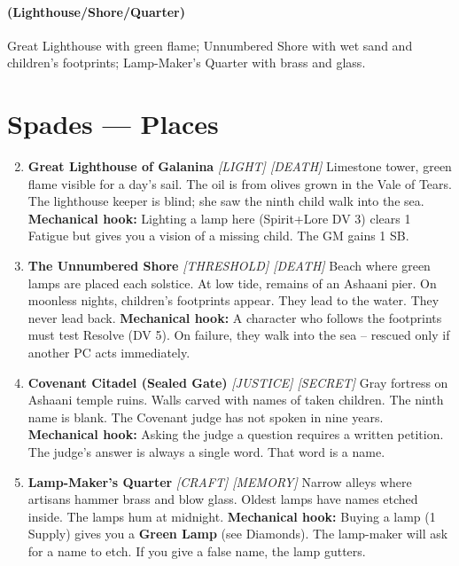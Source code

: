\paragraph*{(Lighthouse/Shore/Quarter)} Great Lighthouse with green flame; Unnumbered Shore with wet sand and children's footprints; Lamp-Maker's Quarter with brass and glass.

\section*{Spades --- Places}
\label{sec:galanina-places}
\begin{enumerate}
\setcounter{enumi}{1}
\item \textbf{Great Lighthouse of Galanina} \hfill \textit{[LIGHT] [DEATH]}  
  Limestone tower, green flame visible for a day's sail. The oil is from olives grown in the Vale of Tears. The lighthouse keeper is blind; she saw the ninth child walk into the sea.  
  \textbf{Mechanical hook:} Lighting a lamp here (Spirit+Lore DV 3) clears 1 Fatigue but gives you a vision of a missing child. The GM gains 1 SB.

\item \textbf{The Unnumbered Shore} \hfill \textit{[THRESHOLD] [DEATH]}  
  Beach where green lamps are placed each solstice. At low tide, remains of an Ashaani pier. On moonless nights, children's footprints appear. They lead to the water. They never lead back.  
  \textbf{Mechanical hook:} A character who follows the footprints must test Resolve (DV 5). On failure, they walk into the sea -- rescued only if another PC acts immediately.

\item \textbf{Covenant Citadel (Sealed Gate)} \hfill \textit{[JUSTICE] [SECRET]}  
  Gray fortress on Ashaani temple ruins. Walls carved with names of taken children. The ninth name is blank. The Covenant judge has not spoken in nine years.  
  \textbf{Mechanical hook:} Asking the judge a question requires a written petition. The judge's answer is always a single word. That word is a name.

\item \textbf{Lamp-Maker's Quarter} \hfill \textit{[CRAFT] [MEMORY]}  
  Narrow alleys where artisans hammer brass and blow glass. Oldest lamps have names etched inside. The lamps hum at midnight.  
  \textbf{Mechanical hook:} Buying a lamp (1 Supply) gives you a \textbf{Green Lamp} (see Diamonds). The lamp-maker will ask for a name to etch. If you give a false name, the lamp gutters.


\end{enumerate}
